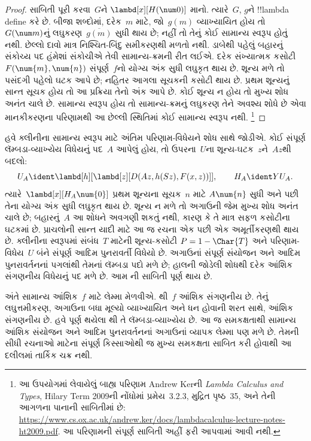 \documentclass[../../../include/open-logic-section]{subfiles}
\begin{document}
\begin{proof}
સાબિતી પૂરી કરવા~$G$ને $\lambd[x][H(\num 0)]$ માનો.
ત્યારે~$G$, $g$ને !!{lambda define} કરે છે. બીજા શબ્દોમાં,
દરેક~$m$ માટે, જો~$g(m)$ વ્યાખ્યાયિત હોય તો
$G(\num m)$નું લઘુકરણ~$\overline {g(m)}$ સુધી થાય છે;
નહીં તો તેનું કોઈ સામાન્ય સ્વરૂપ હોતું નથી. છેલ્લો દાવો માત્ર
નિશ્ચિત-બિંદુ સમીકરણથી મળતો નથી. ડાબેથી પહેલું બહારનું સંકોચ્ય
પદ હંમેશાં સંકોચીએ તેવી સામાન્ય-ક્રમની રીત લઈએ. દરેક સંખ્યાત્મક
કસોટી~$F(\num{m},\num{n})$ સંપૂર્ણ~$f$નો યોગ્ય અંક સુધી
લઘુકૃત થાય છે. શૂન્ય મળે તો પસંદગી પહેલો ઘટક આપે છે; નહિતર
આગલા સૂચકની કસોટી થાય છે. પ્રથમ શૂન્યનું સાન્ત સૂચક હોય તો આ
પ્રક્રિયા તેનો અંક આપે છે. કોઈ શૂન્ય ન હોય તો મુખ્ય શોધ અનંત
ચાલે છે. સામાન્ય સ્વરૂપ હોય તો સામાન્ય-ક્રમનું લઘુકરણ તેને
અવશ્ય શોધે છે એવા માનકીકરણના પરિણામથી આ છેલ્લી સ્થિતિમાં
કોઈ સામાન્ય સ્વરૂપ નથી.
\footnote{આ ઉપયોગમાં લેવાયેલું બાહ્ય પરિણામ Andrew Kerની
\emph{Lambda Calculus and Types}, Hilary Term 2009ની નોંધોમાં
પ્રમેય~3.2.3, મુદ્રિત પૃષ્ઠ~35, અને તેની આગળના પાનાની સાબિતીમાં છે:
\url{https://www.cs.ox.ac.uk/andrew.ker/docs/lambdacalculus-lecture-notes-ht2009.pdf}.
આ પરિણામની સંપૂર્ણ સાબિતી અહીં ફરી આપવામાં આવી નથી.}
\end{proof}


હવે ક્લીનીના સામાન્ય સ્વરૂપ માટે અંતિમ પરિણામ-વિધેયને શોધ સાથે
જોડીએ. કોઈ સંપૂર્ણ લૅમ્બડા-વ્યાખ્યેય વિધેયનું પદ~$A$ આપેલું હોય,
તો ઉપરના~$U$ના શૂન્ય-ઘટક~$z$ને~$Az$થી બદલો:
\[
U_A\ident\lambd[h][\lambd[z][D(Az,h(Sz),F(x,z))]],
\qquad H_A\ident YU_A.
\]
ત્યારે~$\lambd[x][H_A\num{0}]$ પ્રથમ શૂન્યના સૂચક~$n$ માટે
$A\num{n}$ સુધી અને પછી તેના યોગ્ય અંક સુધી લઘુકૃત થાય છે.
શૂન્ય ન મળે તો અગાઉની જેમ મુખ્ય શોધ અનંત ચાલે છે; બહારનું~$A$
આ શોધને અવગણી શકતું નથી, કારણ કે તે માત્ર સફળ કસોટીના ઘટકમાં છે.
પ્રાચલોની સાન્ત યાદી માટે આ જ રચના એક પછી એક અમૂર્તીકરણથી થાય છે.
ક્લીનીના સ્વરૂપમાં સંબંધ~$T$ માટેની શૂન્ય-કસોટી
$P=1-\Char{T}$ અને પરિણામ-વિધેય~$U$ બંને સંપૂર્ણ
આદિમ પુનરાવર્તી વિધેયો છે. અગાઉનાં સંપૂર્ણ સંયોજન અને આદિમ પુનરાવર્તનનાં
પગલાંથી તેમનાં લૅમ્બડા પદો મળે છે; હાલની જોડેલી શોધથી દરેક
આંશિક સંગણનીય વિધેયનું પદ મળે છે. આમ
ની સાબિતી પૂર્ણ થાય છે.

અંતે સામાન્ય આંશિક~$f$ માટે લેમ્મા મેળવીએ.
થી~$f$ આંશિક સંગણનીય છે.
તેનું લઘુત્તમીકરણ, અગાઉના બધા મૂલ્યો વ્યાખ્યાયિત અને ધન હોવાની
શરત સાથે, આંશિક સંગણનીય છે. હવે પૂર્ણ થયેલા
થી તે લૅમ્બડા-વ્યાખ્યેય છે.
આ જ સમકક્ષતાથી સામાન્ય આંશિક સંયોજન અને આદિમ પુનરાવર્તનનાં
અગાઉનાં વ્યાપક લેમ્મા પણ મળે છે. તેમની સીધી રચનાઓ માટેના
સંપૂર્ણ કિસ્સાઓથી જ મુખ્ય સમકક્ષતા સાબિત કરી હોવાથી આ દલીલમાં
તાર્કિક ચક્ર નથી.
\end{document}
